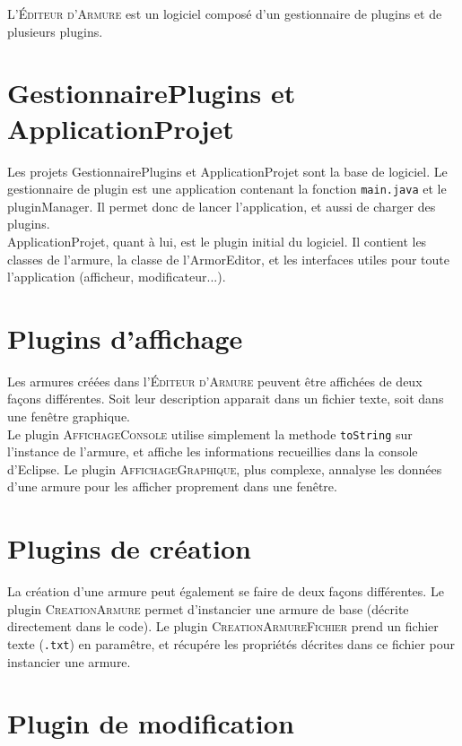

L'\textsc{\'Editeur d'Armure} est un logiciel composé d'un gestionnaire de plugins et de plusieurs plugins. \\


\section{GestionnairePlugins et ApplicationProjet}

Les projets GestionnairePlugins et ApplicationProjet sont la base de logiciel. Le gestionnaire de plugin est une application contenant la fonction \texttt{main.java} et le pluginManager. Il permet donc de lancer l'application, et aussi de charger des plugins. \\

ApplicationProjet, quant à lui, est le plugin initial du logiciel. Il contient les classes de l'armure, la classe de l'ArmorEditor, et les interfaces utiles pour toute l'application (afficheur, modificateur...).


\section{Plugins d'affichage}

Les armures créées dans l'\textsc{\'Editeur d'Armure} peuvent être affichées de deux façons différentes. Soit leur description apparait dans un fichier texte, soit dans une fenêtre graphique.\\

Le plugin \textsc{AffichageConsole} utilise simplement la methode \texttt{toString} sur l'instance de l'armure, et affiche les informations recueillies dans la console d'Eclipse. Le plugin \textsc{AffichageGraphique}, plus complexe, annalyse les données d'une armure pour les afficher proprement dans une fenêtre.


\section{Plugins de création}

La création d'une armure peut également se faire de deux façons différentes. Le plugin \textsc{CreationArmure} permet d'instancier une armure de base (décrite directement dans le code). Le plugin \textsc{CreationArmureFichier} prend un fichier texte (\texttt{.txt}) en paramêtre, et récupére les propriétés décrites dans ce fichier pour instancier une armure.


\section{Plugin de modification}
